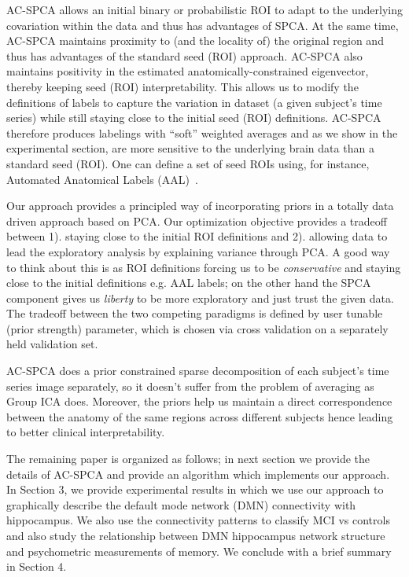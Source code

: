 \documentclass{llncs}
\begin{document}
AC-SPCA allows an initial binary or probabilistic ROI to adapt to
the underlying covariation within the data and thus has advantages of
SPCA.  At the same time, AC-SPCA maintains proximity to (and the
locality of) the original region and thus has advantages of the
standard seed (ROI) approach.  AC-SPCA also maintains positivity in the
estimated anatomically-constrained eigenvector, thereby keeping seed (ROI)
interpretability. This allows us to modify the definitions of labels to capture the variation in dataset (a given subject's time series) while still staying close to the initial seed (ROI) definitions. AC-SPCA therefore produces
labelings with ``soft'' weighted averages and as we show in the
experimental section, are more sensitive to the underlying
brain data than a standard seed (ROI). One can define a set of seed ROIs using, for instance, Automated Anatomical Labels (AAL)~\cite{tzourio2002automated}.

Our approach provides a principled way of incorporating priors in a totally data driven approach based on PCA. Our optimization objective provides a tradeoff between 1). staying close to the initial ROI definitions and 2). allowing data to lead the exploratory analysis by explaining variance through PCA. A good way to think about this is as ROI definitions forcing us to be {\em conservative} and staying close to the initial definitions e.g. AAL labels; on the other hand the SPCA component gives us {\em liberty} to be more exploratory and just trust the given data. The tradeoff between the two competing paradigms is defined by user tunable (prior strength) parameter, which is chosen via cross validation on a separately held validation set. 

AC-SPCA does a prior constrained sparse decomposition of each subject's time series image separately, so it doesn't suffer from the problem of averaging as Group ICA does. Moreover, the priors help us maintain a direct correspondence between the anatomy of the same regions across different subjects hence leading to better clinical interpretability.

The remaining paper is organized as follows; in next section we provide the details of AC-SPCA and provide an algorithm which implements our approach. In Section 3, we provide experimental results in which we use our approach to graphically describe the default mode network (DMN) connectivity with hippocampus. We also use the connectivity patterns to classify MCI vs controls and also study the relationship between DMN hippocampus network structure and psychometric measurements of memory. We conclude with a brief summary in Section 4.
\end{document}
